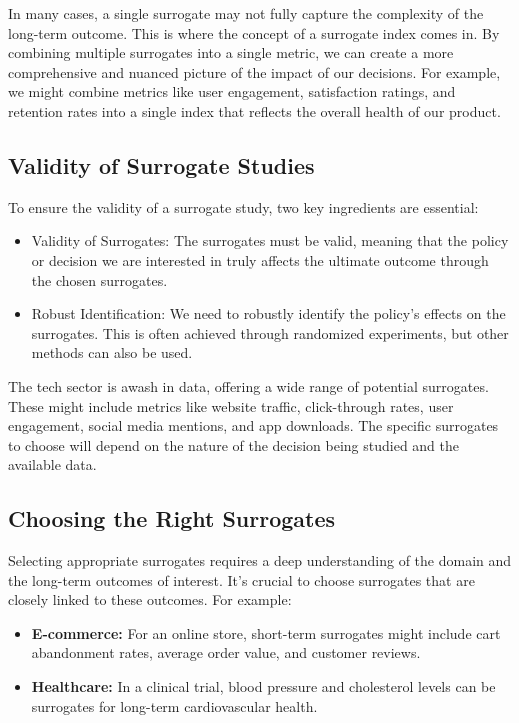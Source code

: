 \documentclass[
  letterpaper,
  DIV=11,
  numbers=noendperiod]{scrreprt}
\providecommand{\tightlist}{%
  \setlength{\itemsep}{0pt}\setlength{\parskip}{0pt}}\usepackage{longtable,booktabs,array}
\begin{document}
In many cases, a single surrogate may not fully capture the complexity
of the long-term outcome. This is where the concept of a surrogate index
comes in. By combining multiple surrogates into a single metric, we can
create a more comprehensive and nuanced picture of the impact of our
decisions. For example, we might combine metrics like user engagement,
satisfaction ratings, and retention rates into a single index that
reflects the overall health of our product.

\subsection{Validity of Surrogate
Studies}\label{validity-of-surrogate-studies}

To ensure the validity of a surrogate study, two key ingredients are
essential:

\begin{itemize}
\tightlist
\item
  Validity of Surrogates: The surrogates must be valid, meaning that the
  policy or decision we are interested in truly affects the ultimate
  outcome through the chosen surrogates.
\item
  Robust Identification: We need to robustly identify the policy's
  effects on the surrogates. This is often achieved through randomized
  experiments, but other methods can also be used.
\end{itemize}

The tech sector is awash in data, offering a wide range of potential
surrogates. These might include metrics like website traffic,
click-through rates, user engagement, social media mentions, and app
downloads. The specific surrogates to choose will depend on the nature
of the decision being studied and the available data.

\subsection{Choosing the Right
Surrogates}\label{choosing-the-right-surrogates}

Selecting appropriate surrogates requires a deep understanding of the
domain and the long-term outcomes of interest. It's crucial to choose
surrogates that are closely linked to these outcomes. For example:

\begin{itemize}
\tightlist
\item
  \textbf{E-commerce:} For an online store, short-term surrogates might
  include cart abandonment rates, average order value, and customer
  reviews.
\item
  \textbf{Healthcare:} In a clinical trial, blood pressure and
  cholesterol levels can be surrogates for long-term cardiovascular
  health.
\end{itemize}
\end{document}
